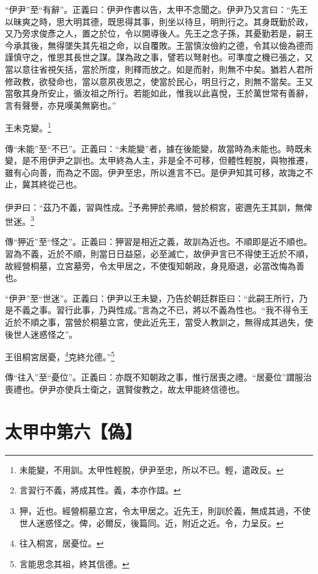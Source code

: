 {\noindent\shu{}\fzkt “伊尹”至“有辭”。正義曰：伊尹作書以告，太甲不念聞之。伊尹乃又言曰：“先王以昧爽之時，思大明其德，既思得其事，則坐以待旦，明則行之。其身既勤於政，又乃旁求俊彥之人，置之於位，令以開導後人。先王之念子孫，其憂勤若是，嗣王今承其後，無得墜失其先祖之命，以自覆敗。王當慎汝儉約之德，令其以儉為德而謹慎守之，惟思其長世之謀。謀為政之事，譬若以弩射也。可準度之機已張之，又當以意往省視矢括，當於所度，則釋而放之。如是而射，則無不中矣。猶若人君所修政教，欲發命也，當以意夙夜思之，使當於民心，明旦行之，則無不當矣。王又當敬其身所安止，循汝祖之所行。若能如此，惟我以此喜悅，王於萬世常有善辭，言有聲譽，亦見嘆美無窮也。” \par}

王未克變。\footnote{未能變，不用訓。太甲性輕脫，伊尹至忠，所以不已。輕，遣政反。}

{\noindent\zhuan{}\fzbyks 傳“未能”至“不已”。正義曰：“未能變”者，據在後能變，故當時為未能也。時既未變，是不用伊尹之訓也。太甲終為人主，非是全不可移，但體性輕脫，與物推遷，雖有心向善，而為之不固。伊尹至忠，所以進言不已。是伊尹知其可移，故誨之不止，冀其終從己也。 \par}

伊尹曰：“茲乃不義，習與性成。\footnote{言習行不義，將成其性。義，本亦作誼。}予弗狎於弗順，營於桐宮，密邇先王其訓，無俾世迷。\footnote{狎，近也。經營桐墓立宮，令太甲居之。近先王，則訓於義，無成其過，不使世人迷惑怪之。俾，必爾反，後篇同。近，附近之近。令，力呈反。}


{\noindent\zhuan{}\fzbyks 傳“狎近”至“怪之”。正義曰：狎習是相近之義，故訓為近也。不順即是近不順也。習為不義，近於不順，則當日日益惡，必至滅亡，故伊尹言已不得使王近於不順，故經營桐墓，立宮墓旁，令太甲居之，不使復知朝政，身見廢退，必當改悔為善也。 \par}

{\noindent\shu{}\fzkt “伊尹”至“世迷”。正義曰：伊尹以王未變，乃告於朝廷群臣曰：“此嗣王所行，乃是不義之事。習行此事，乃與性成。”言為之不已，將以不義為性也。“我不得令王近於不順之事，當營於桐墓立宮，使此近先王，當受人教訓之，無得成其過失，使後世人迷惑怪之”。 \par}

王徂桐宮居憂，\footnote{往入桐宮，居憂位。}克終允德。”\footnote{言能思念其祖，終其信德。}

{\noindent\zhuan{}\fzbyks 傳“往入”至“憂位”。正義曰：亦既不知朝政之事，惟行居喪之禮。“居憂位”謂服治喪禮也。伊尹亦使兵士衛之，選賢俊教之，故太甲能終信德也。 \par}

\section{太甲中第六【偽】}


